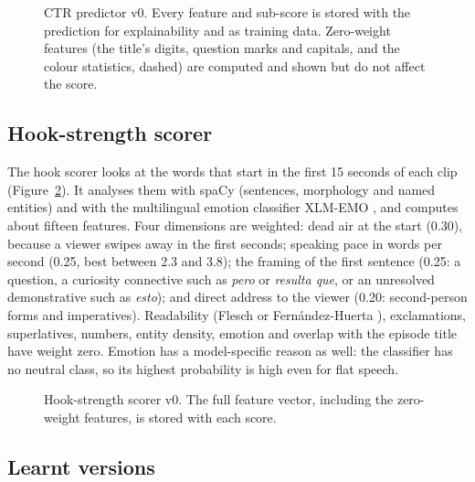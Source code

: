 \begin{figure}[H]
\centering
{}
\caption{CTR predictor v0. Every feature and sub-score is stored with the prediction for explainability and as training data. Zero-weight features (the title's digits, question marks and capitals, and the colour statistics, dashed) are computed and shown but do not affect the score.}
\label{fig:ctr}
\end{figure}

\subsection*{Hook-strength scorer}

The hook scorer looks at the words that start in the first 15 seconds of each clip (Figure~\ref{fig:hook}). It analyses them with spaCy \cite{spacy2020} (sentences, morphology and named entities) and with the multilingual emotion classifier XLM-EMO \cite{bianchi2022xlmemo}, and computes about fifteen features. Four dimensions are weighted: dead air at the start (0.30), because a viewer swipes away in the first seconds; speaking pace in words per second (0.25, best between 2.3 and 3.8); the framing of the first sentence (0.25: a question, a curiosity connective such as \textit{pero} or \textit{resulta que}, or an unresolved demonstrative such as \textit{esto}); and direct address to the viewer (0.20: second-person forms and imperatives). Readability (Flesch \cite{flesch1948} or Fernández-Huerta \cite{fernandezhuerta1959}), exclamations, superlatives, numbers, entity density, emotion and overlap with the episode title have weight zero. Emotion has a model-specific reason as well: the classifier has no neutral class, so its highest probability is high even for flat speech.

\begin{figure}[H]
\centering
{}
\caption{Hook-strength scorer v0. The full feature vector, including the zero-weight features, is stored with each score.}
\label{fig:hook}
\end{figure}

\subsection*{Learnt versions}

